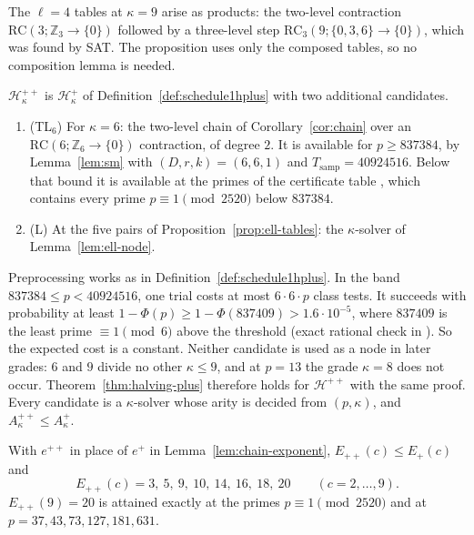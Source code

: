 The $\ell = 4$ tables at $\kappa = 9$ arise as products: the two-level contraction $\mathrm{RC}(3;\mathbb{Z}_3\to\{0\})$ followed by a three-level step $\mathrm{RC}_3(9;\{0,3,6\}\to\{0\})$, which was found by SAT. The proposition uses only the composed tables, so no composition lemma is needed.

\begin{definition}[Schedule~1H$^{++}$]
\label{def:schedule1hplus2}
$\mathcal H^{++}_\kappa$ is $\mathcal H^+_\kappa$ of Definition~\ref{def:schedule1hplus} with two additional candidates.
\begin{enumerate}[label=\textup{(\alph*)},leftmargin=2em,start=7]
  \item \textup{(TL$_6$)} For $\kappa = 6$: the two-level chain of Corollary~\ref{cor:chain} over an $\mathrm{RC}(6;\mathbb{Z}_6\to\{0\})$ contraction, of degree $2$. It is available for $p \ge 837384$, by Lemma~\ref{lem:sm} with $(D,r,k) = (6,6,1)$ and $T_{\mathrm{samp}} = 40924516$. Below that bound it is available at the primes of the certificate table , which contains every prime $p \equiv 1 \pmod{2520}$ below $837384$.
  \item \textup{(L)} At the five pairs of Proposition~\ref{prop:ell-tables}: the $\kappa$-solver of Lemma~\ref{lem:ell-node}.
\end{enumerate}
\end{definition}

Preprocessing works as in Definition~\ref{def:schedule1hplus}. In the band $837384 \le p < 40924516$, one trial costs at most $6\cdot6\cdot p$ class tests. It succeeds with probability at least $1-\Phi(p) \ge 1-\Phi(837409) > 1.6\cdot10^{-5}$, where $837409$ is the least prime $\equiv 1 \pmod 6$ above the threshold (exact rational check in ). So the expected cost is a constant. Neither candidate is used as a node in later grades: $6$ and $9$ divide no other $\kappa \le 9$, and at $p = 13$ the grade $\kappa = 8$ does not occur. Theorem~\ref{thm:halving-plus} therefore holds for $\mathcal H^{++}$ with the same proof. Every candidate is a $\kappa$-solver whose arity is decided from $(p,\kappa)$, and $A^{++}_\kappa \le A^+_\kappa$.

\begin{lemma}
\label{lem:chain-exponent-v2}
With $e^{++}$ in place of $e^+$ in Lemma~\ref{lem:chain-exponent}, $E_{++}(c) \le E_+(c)$ and
\[
  E_{++}(c) = 3,\ 5,\ 9,\ 10,\ 14,\ 16,\ 18,\ 20 \qquad (c = 2,\dots,9).
\]
$E_{++}(9) = 20$ is attained exactly at the primes $p \equiv 1 \pmod{2520}$ and at $p = 37, 43, 73, 127, 181, 631$.
\end{lemma}

